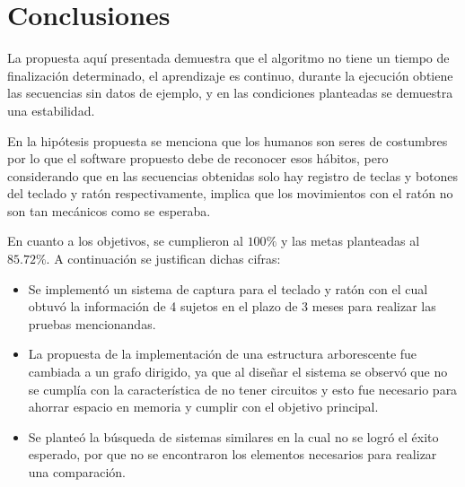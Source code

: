 \section{Conclusiones}
La propuesta aqu\'{i} presentada demuestra que el algoritmo no tiene
 un tiempo de finalizaci\'on determinado, el aprendizaje es continuo, durante 
 la ejecuci\'on obtiene las secuencias sin datos de ejemplo, y en las
 condiciones planteadas se demuestra una estabilidad.
 

En la hip\'otesis propuesta se menciona que los humanos son seres de 
 costumbres por lo que el software propuesto debe de reconocer esos h\'abitos, 
 pero considerando que en las secuencias obtenidas solo hay registro de teclas
 y botones del teclado y rat\'on respectivamente, implica que los movimientos
 con el rat\'on no son tan mec\'anicos como se esperaba. 

 
En cuanto a los objetivos, se cumplieron al $100\%$ y las metas planteadas 
 al $85.72\%$. A continuaci\'on se justifican dichas cifras:


\begin{itemize}
\item {
Se implement\'o un sistema de captura para el teclado y rat\'on con el cual 
 obtuv\'o la informaci\'on de 4 sujetos en el plazo de 3 meses para 
 realizar las pruebas mencionandas.
}
	
\item {
La propuesta de la implementaci\'on de una estructura arborescente fue cambiada
 a un grafo dirigido, ya que al dise\~nar el sistema se observ\'o que no se 
 cumpl\'ia con la caracter\'istica de no tener circuitos y esto fue necesario
 para ahorrar espacio en memoria y cumplir con el objetivo principal.
}

\item {
Se plante\'o la b\'usqueda de sistemas similares en la cual no se logr\'o 
 el \'exito esperado, por que no se encontraron los elementos necesarios 
 para realizar una comparaci\'on.
}
\end{itemize}

